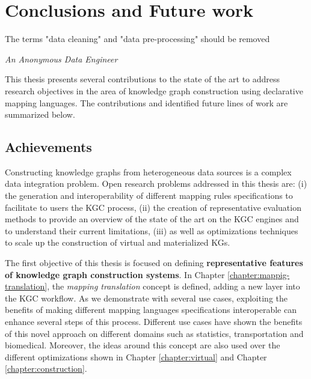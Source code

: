 \chapter{Conclusions and Future work}
\label{chap:conc}

\epigraph{The terms "data cleaning" and "data pre-processing" should be removed}{\textit{An Anonymous Data Engineer}}

This thesis presents several contributions to the state of the art to address research objectives in the area of knowledge graph construction using declarative mapping languages. The contributions and identified future lines of work are summarized below.


\section{Achievements}
Constructing knowledge graphs from heterogeneous data sources is a complex data integration problem. Open research problems addressed in this thesis are: (i) the generation and interoperability of different mapping rules specifications to facilitate to users the KGC process, (ii) the creation of representative evaluation methods to provide an overview of the state of the art on the KGC engines and to understand their current limitations, (iii) as well as optimizations techniques to scale up the construction of virtual and materialized KGs. 
 
 
The first objective of this thesis is focused on defining \textbf{representative features of knowledge graph construction systems}. In Chapter \ref{chapter:mappig-translation}, the \textit{mapping translation} concept is defined, adding a new layer into the KGC workflow. As we demonstrate with several use cases, exploiting the benefits of making different mapping languages specifications interoperable can enhance several steps of this process. Different use cases have shown the benefits of this novel approach on different domains such as statistics, transportation and biomedical. Moreover, the ideas around this concept are also used over the different optimizations shown in Chapter \ref{chapter:virtual} and Chapter \ref{chapter:construction}.

